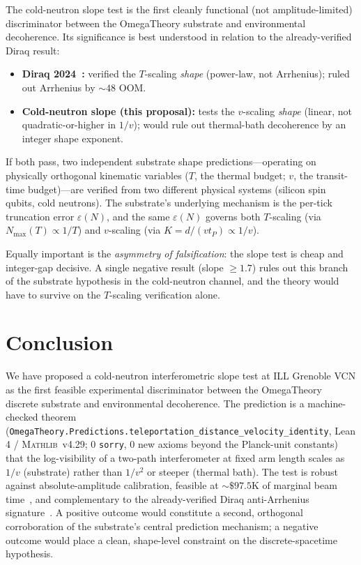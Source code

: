 \documentclass[aps,prl,twocolumn,superscriptaddress,nofootinbib,10pt]{revtex4-2}
\newcommand{\tP}{t_P}
\newcommand{\eps}{\varepsilon}
\newcommand{\Nmax}{N_{\max}}
\newcommand{\mathlibv}{\textsc{Mathlib}~v4.29}
\begin{document}
The cold-neutron slope test is the first cleanly functional (not
amplitude-limited) discriminator between the OmegaTheory substrate
and environmental decoherence. Its significance is best understood in
relation to the already-verified Diraq result:
\begin{itemize}\itemsep0pt
  \item \textbf{Diraq 2024~\cite{Huang2024Diraq}:} verified the
  $T$-scaling \emph{shape} (power-law, not Arrhenius); ruled out
  Arrhenius by $\sim 48$ OOM.
  \item \textbf{Cold-neutron slope (this proposal):} tests the
  $v$-scaling \emph{shape} (linear, not quadratic-or-higher in
  $1/v$); would rule out thermal-bath decoherence by an integer
  shape exponent.
\end{itemize}
If both pass, two independent substrate shape predictions---operating
on physically orthogonal kinematic variables ($T$, the thermal budget;
$v$, the transit-time budget)---are verified from two different
physical systems (silicon spin qubits, cold neutrons). The substrate's
underlying mechanism is the per-tick truncation error $\eps(N)$, and
the same $\eps(N)$ governs both $T$-scaling (via
$\Nmax(T) \propto 1/T$) and $v$-scaling (via
$K = d/(v\tP) \propto 1/v$).

Equally important is the \emph{asymmetry of falsification}: the slope
test is cheap and integer-gap decisive.  A single negative result
(slope $\geq 1.7$) rules out this branch of the substrate hypothesis
in the cold-neutron channel, and the theory would have to survive on
the $T$-scaling verification alone.

\section{Conclusion}

We have proposed a cold-neutron interferometric slope test at ILL
Grenoble VCN as the first feasible experimental discriminator between
the OmegaTheory discrete substrate and environmental decoherence. The
prediction is a machine-checked theorem
(\texttt{OmegaTheory.Predictions.teleportation\_distance\_velocity\_identity},
Lean 4 / \mathlibv; 0 \texttt{sorry}, 0 new axioms beyond the
Planck-unit constants) that the log-visibility of a two-path
interferometer at fixed arm length scales as $1/v$ (substrate) rather
than $1/v^{2}$ or steeper (thermal bath). The test is robust against
absolute-amplitude calibration, feasible at $\sim\$97.5$K of marginal
beam time~\cite{Alnitak2026Supp}, and complementary to the
already-verified Diraq anti-Arrhenius signature~\cite{Huang2024Diraq}.
A positive outcome would constitute a second, orthogonal corroboration
of the substrate's central prediction mechanism; a negative outcome
would place a clean, shape-level constraint on the discrete-spacetime
hypothesis.
\end{document}
